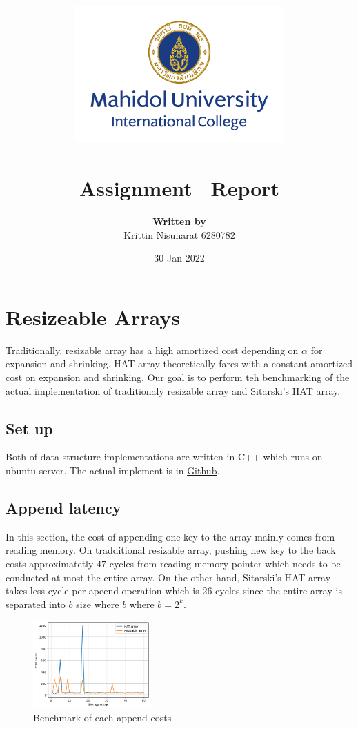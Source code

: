 \documentclass[a4paper, 12pt]{report}
\title{
	{\includegraphics[width=80mm,scale=0.5]{MUIC_Logo_Eng_Center.png}} \\
	{\textbf{\mySubject}}\\
	{\large Assignment \myhwnum \ Report}\\
}
\author{
	{\textbf{Written by}} \\ 
	{Krittin Nisunarat 6280782}
}
\date{30 Jan 2022}
\begin{document}
\maketitle
\tableofcontents

\chapter{Resizeable Arrays}

Traditionally, resizable array has a high amortized cost depending on $\alpha$ for expansion and shrinking. HAT array theoretically fares
with a constant amortized cost on expansion and shrinking. Our goal is to perform teh benchmarking of the actual implementation of 
traditionaly resizable array and Sitarski's HAT array.

\section{Set up}

Both of data structure implementations are written in C++ which runs on ubuntu server. 
The actual implement is in \href{https://github.com/sudo-lucifer/applied-algo-hw1/tree/main/hat_array}{Github}.

\section{Append latency}

In this section, the cost of appending one key to the array mainly comes from reading memory. 
On tradditional resizable array, pushing new key to the back costs approximatetly 47 cycles
from reading memory pointer which needs to be conducted at most the entire array. On the other hand,
Sitarski's HAT array takes less cycle per apeend operation which is 26 cycles since the entire array is separated 
into $b$ size where $b$ where $b = 2^k$.

\begin{figure}[h]
        \centering
        \includegraphics[width=0.4\textwidth,scale=0.2]{append_latency_output.png}
        \caption{\label{fig:append-latency} Benchmark of each append costs}
\end{figure}
\end{document}
